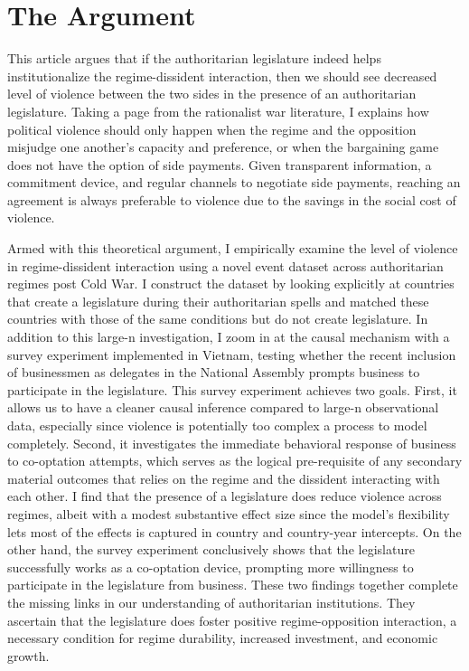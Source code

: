 \section{The Argument}
\label{sec:argument}

This article argues that if the authoritarian legislature indeed helps institutionalize the regime-dissident interaction, then we should see decreased level of violence between the two sides in the presence of an authoritarian legislature. Taking a page from the rationalist war literature, I explains how political violence should only happen when the regime and the opposition misjudge one another's capacity and preference, or when the bargaining game does not have the option of side payments. Given transparent information, a commitment device, and regular channels to negotiate side payments, reaching an agreement is always preferable to violence due to the savings in the social cost of violence.

Armed with this theoretical argument, I empirically examine the level of violence in regime-dissident interaction using a novel event dataset across authoritarian regimes post Cold War. I construct the dataset by looking explicitly at countries that create a legislature during their authoritarian spells and matched these countries with those of the same conditions but do not create legislature. In addition to this large-n investigation, I zoom in at the causal mechanism with a survey experiment implemented in Vietnam, testing whether the recent inclusion of businessmen as delegates in the National Assembly prompts business to participate in the legislature. This survey experiment achieves two goals. First, it allows us to have a cleaner causal inference compared to large-n observational data, especially since violence is potentially too complex a process to model completely. Second, it investigates the immediate behavioral response of business to co-optation attempts, which serves as the logical pre-requisite of any secondary material outcomes that relies on the regime and the dissident interacting with each other. I find that the presence of a legislature does reduce violence across regimes, albeit with a modest substantive effect size since the model's flexibility lets most of the effects is captured in country and country-year intercepts. On the other hand, the survey experiment conclusively shows that the legislature successfully works as a co-optation device, prompting more willingness to participate in the legislature from business. These two findings together complete the missing links in our understanding of authoritarian institutions. They ascertain that the legislature does foster positive regime-opposition interaction, a necessary condition for regime durability, increased investment, and economic growth.